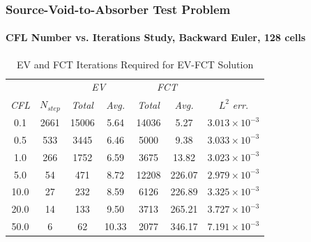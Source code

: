 \begin{frame}
\frametitle{Source-Void-to-Absorber Test Problem}
\framesubtitle{CFL Number vs. Iterations Study, Backward Euler, 128 cells}

\begin{center}
\begin{table}[h]
\caption{EV and FCT Iterations Required for EV-FCT Solution}
\begin{tabular}{c c c c c c c }\toprule
 & & \multicolumn{2}{c}{\emph{EV}}
  & \multicolumn{2}{c}{\emph{FCT}} &\\
\emph{CFL} & $N_{step}$ & \emph{Total} & \emph{Avg.}
  & \emph{Total} & \emph{Avg.} & $L^2$ \emph{err.}\\\midrule
0.1 & 2661 & 15006 &  5.64 & 14036 &   5.27 & $3.013\times10^{-3}$\\
0.5 &  533 &  3445 &  6.46 &  5000 &   9.38 & $3.033\times10^{-3}$\\
1.0 &  266 &  1752 &  6.59 &  3675 &  13.82 & $3.023\times10^{-3}$\\
5.0 &   54 &   471 &  8.72 & 12208 & 226.07 & $2.979\times10^{-3}$\\
10.0 &  27 &   232 &  8.59 &  6126 & 226.89 & $3.325\times10^{-3}$\\
20.0 &  14 &   133 &  9.50 &  3713 & 265.21 & $3.727\times10^{-3}$\\
50.0 &   6 &    62 & 10.33 &  2077 & 346.17 & $7.191\times10^{-3}$\\
\bottomrule\end{tabular}
\end{table}
\end{center}

\end{frame}
